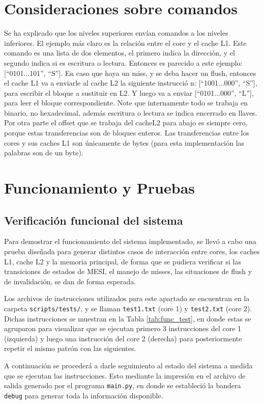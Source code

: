 \documentclass {article}
\begin{document}
\section{Consideraciones sobre comandos}
Se ha explicado que los niveles superiores envían comandos a los niveles inferiores. El ejemplo más
claro es la relación entre el core y el cache L1. Este comando es una lista de dos elementos, el
primero indica la dirección, y el segundo indica si es escritura o lectura. Entonces es parecido a
este ejemplo: [``0101...101'', ``{S}'']. En caso que haya un miss, y se deba hacer un flush, entonces el
cache L1 va a enviarle al cache L2 la siguiente instrucci\'o n: [``1001...000'', ``{S}''], para escribir
el bloque a sustituir en L2. Y luego va a enviar [``0101...000'', ``{L}''], para leer el bloque
correspondiente. Note que internamente todo se trabaja en binario, no hexadecimal, además escritura
o lectura se indica encerrado en llaves. Por otra parte el offset que se trabaja del cacheL2 para
abajo es siempre cero, porque estas transferencias son de bloques enteros. Las transferencias entre
los cores y sus caches L1 son únicamente de bytes (para esta implementación las palabras son de un byte). 


\section{Funcionamiento y Pruebas}
\subsection{Verificación funcional del sistema}
Para demostrar el funcionamiento del sistema implementado, se llevó a cabo una prueba diseñada para
generar distintos casos de interacción entre cores, los caches L1, cache L2 y la memoria principal,
de forma que se pudiera verificar si las transiciones de estados de MESI, el manejo de misses, las
situaciones de flush y de invalidación, se dan de forma esperada. 

Los archivos de instrucciones utilizados para este apartado se encuentran en la carpeta
\texttt{scripts/tests/}, y se llaman \texttt{test1.txt} (core 1) y \texttt{test2.txt} (core
2). Dichas instrucciones se muestran en la Tabla \ref{tab:func_test}, en donde estas se agruparon
para visualizar que se ejecutan primero 3 instrucciones del core 1 (izquierda) y luego una
instrucción del core 2 (derecha) para posteriormente repetir el mismo patrón con las siguientes.

A continuación se procederá a darle seguimiento al estado del sistema a medida que se ejecutan las
instrucciones. Esto mediante la impresión en el archivo de salida generado por el programa
\texttt{main.py}, en donde se estableció la bandera \texttt{debug} para generar toda la información
disponible. 
\end{document}
